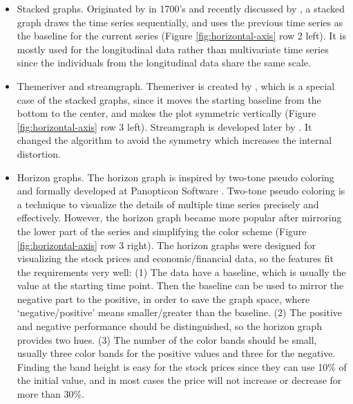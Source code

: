 \documentclass[12pt]{article}
\begin{document}
\begin{enumerate}
\begin{itemize}
\item Stacked graphs. Originated by \citeauthor{playfair2005playfair} in
1700's and recently discussed by \citet{byron2008stacked,javed2010graphical,heer2010tour},
a stacked graph draws the time series sequentially, and uses the previous
time series as the baseline for the current series (Figure \ref{fig:horizontal-axis} row 2 left). It is mostly used
for the longitudinal data rather than multivariate time series since
the individuals from the longitudinal data share the same scale.

\item Themeriver and streamgraph. Themeriver is created by \citet{havre2000themeriver},
which is a special case of the stacked graphs, since it moves the
starting baseline from the bottom to the center, and makes the plot
symmetric vertically (Figure \ref{fig:horizontal-axis} row 3 left). Streamgraph is developed later by \citet{byron2008stacked}.
It changed the algorithm to avoid the symmetry which increases the
internal distortion.

\item Horizon graphs. The horizon graph is inspired by two-tone pseudo coloring
\citep{saito2005two} and formally developed at Panopticon Software
\citep{reijner2008development}. Two-tone pseudo coloring is a technique
to visualize the details of multiple time series precisely and effectively.
However, the horizon graph became more popular after mirroring the
lower part of the series and simplifying the color scheme (Figure \ref{fig:horizontal-axis} row 3 right). The horizon
graphs were designed for visualizing the stock prices and economic/financial
data, so the features fit the requirements very well:  (1) The data
have a baseline, which is usually the value at the starting time point.
Then the baseline can be used to mirror the negative part to the positive,
in order to save the graph space, where `negative/positive' means
smaller/greater than the baseline.  (2) The positive and negative performance
should be distinguished, so the horizon graph provides two hues.  (3)
The number of the color bands should be small, usually three color
bands for the positive values and three for the negative. Finding
the band height is easy for the stock prices since they can use 10\%
of the initial value, and in most cases the price will not increase
or decrease for more than 30\%.


\end{itemize}
\end{enumerate}
\end{document}
